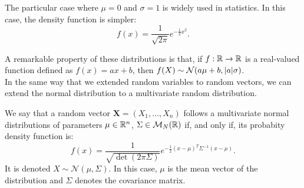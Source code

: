 The particular case where $\mu = 0$ and $\sigma = 1$ is widely used in statistics. In this case, the density function is simpler:
\[
f(x) = \frac{1}{\sqrt{2\pi}}e^{-\frac{1}{2}x^2}.
\]

A remarkable property of these distributions is that, if $f : \mathbb{R} \to \mathbb{R}$ is a real-valued function defined 
as $f(x) = ax+b$, then $f(X) \sim \mathcal N (a\mu + b, \lvert a\rvert \sigma)$.\\

In the same way that we extended random variables to random vectors, we can extend the normal distribution to a multivariate
random distribution.

\begin{ndef}
We say that a random vector $\bm{X} = (X_1,\dots,X_n)$ follows a multivariate normal distributions of parameters
$\mu \in \mathbb{R}^n$, $\Sigma \in \mathcal M_N(\mathbb{R})$ if, and only if, its probabity density function is:
\[
f(x) = \frac{1}{\sqrt{\det(2\pi \Sigma)}}e^{-\frac{1}{2}(x - \mu )^T \Sigma^{-1} (x-\mu)}.
\]
It is denoted $X \sim \mathcal N(\mu, \Sigma)$.
In this case, $\mu$ is the mean vector of the distribution and $\Sigma$ denotes the covariance matrix.  
\end{ndef}
